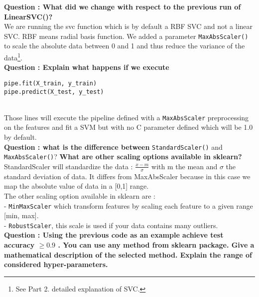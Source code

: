 \textbf{Question : What did we change with respect to the previous run of LinearSVC()?} \\
We are running the svc function which is by default a RBF SVC and not a linear SVC. RBF means radial basis function. We added a parameter \verb|MaxAbsScaler()| to scale the absolute data between 0 and 1 and thus reduce the variance of the data\footnote{See Part 2. detailed explanation of SVC.}. \\

\textbf{Question : Explain what happens if we execute} 
\begin{verbatim}pipe.fit(X_train, y_train)
pipe.predict(X_test, y_test)\end{verbatim} \\
Those lines will execute the pipeline defined with a \verb|MaxAbsScaler|  preprocessing on the features and fit a SVM but with no C parameter defined which will be 1.0 by default.\\

\textbf{Question : what is the difference between} \verb|StandardScaler()| and \verb|MaxAbsScaler()|? \textbf{What are other scaling options available in sklearn? }\\

StandardScaler will standardize the data : $\frac{x-m}{\sigma}$ with m the mean and $\sigma$ the standard deviation of data. It differs from MaxAbsScaler  because in this case we map the absolute value of data in a [0,1] range.\\	

The other scaling option available in sklearn are : \\
- \verb|MinMaxScaler| which transform features by scaling each feature to a given range [min, max]. \\
- \verb|RobustScaler|, this scale is used if your data contains many outliers. \\ 

\textbf{Question : Using the previous code as an example achieve test accuracy  $\geq0.9$ . You can use any method from sklearn package. Give a mathematical description of the selected method. Explain the range of considered hyper-parameters.}\\

